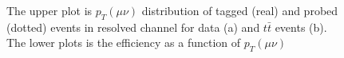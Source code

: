 \begin{figure}[ht]
	\begin{center}
		\caption{The upper plot is $p_{T}(\mu\nu)$ distribution of tagged (real) and probed (dotted) events in resolved channel for data (a) and $t\bar{t}$ events (b). The lower plots is the efficiency as a function of $p_{T}(\mu\nu)$}
		\label{Fig:eff_met_resolved}
	\end{center}
\end{figure}
\noindent

